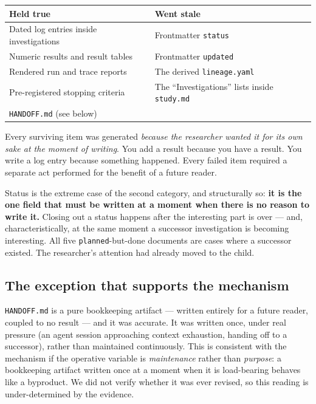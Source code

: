 \documentclass[11pt]{article}
\begin{document}
\begin{table}[h]
\centering
\small
\begin{tabular}{@{}p{}p{}@{}}
\toprule
\textbf{Held true} & \textbf{Went stale} \\
\midrule
Dated log entries inside investigations &
  Frontmatter \texttt{status} \\
Numeric results and result tables &
  Frontmatter \texttt{updated} \\
Rendered run and trace reports &
  The derived \texttt{lineage.yaml} \\
Pre-registered stopping criteria &
  The ``Investigations'' lists inside \texttt{study.md} \\
\texttt{HANDOFF.md} (see below) & \\
\bottomrule
\end{tabular}
\end{table}

\noindent
Every surviving item was generated \emph{because the researcher wanted it
for its own sake at the moment of writing}. You add a result because you
have a result. You write a log entry because something happened. Every
failed item required a separate act performed for the benefit of a future
reader.

Status is the extreme case of the second category, and structurally so:
\textbf{it is the one field that must be written at a moment when there is
no reason to write it.} Closing out a status happens after the interesting
part is over --- and, characteristically, at the same moment a successor
investigation is becoming interesting. All five \texttt{planned}-but-done
documents are cases where a successor existed. The researcher's attention
had already moved to the child.

\subsection{The exception that supports the mechanism}

\texttt{HANDOFF.md} is a pure bookkeeping artifact --- written entirely for
a future reader, coupled to no result --- and it was accurate. It was
written once, under real pressure (an agent session approaching context
exhaustion, handing off to a successor), rather than maintained
continuously. This is consistent with the mechanism if the operative
variable is \emph{maintenance} rather than \emph{purpose}: a bookkeeping
artifact written once at a moment when it is load-bearing behaves like a
byproduct. We did not verify whether it was ever revised, so this reading is
under-determined by the evidence.
\end{document}
